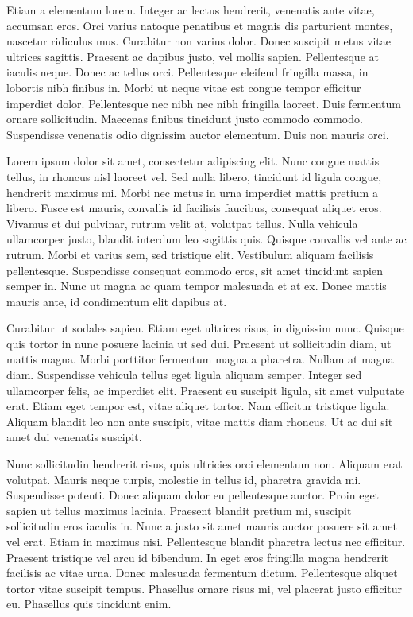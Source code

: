 \documentclass[a4paper,12pt,twoside]{ThesisStyle}
\begin{document}
Etiam a elementum lorem. Integer ac lectus hendrerit, venenatis ante vitae, accumsan eros. Orci varius natoque penatibus et magnis dis parturient montes, nascetur ridiculus mus. Curabitur non varius dolor. Donec suscipit metus vitae ultrices sagittis. Praesent ac dapibus justo, vel mollis sapien. Pellentesque at iaculis neque. Donec ac tellus orci. Pellentesque eleifend fringilla massa, in lobortis nibh finibus in. Morbi ut neque vitae est congue tempor efficitur imperdiet dolor. Pellentesque nec nibh nec nibh fringilla laoreet. Duis fermentum ornare sollicitudin. Maecenas finibus tincidunt justo commodo commodo. Suspendisse venenatis odio dignissim auctor elementum. Duis non mauris orci.

Lorem ipsum dolor sit amet, consectetur adipiscing elit. Nunc congue mattis tellus, in rhoncus nisl laoreet vel. Sed nulla libero, tincidunt id ligula congue, hendrerit maximus mi. Morbi nec metus in urna imperdiet mattis pretium a libero. Fusce est mauris, convallis id facilisis faucibus, consequat aliquet eros. Vivamus et dui pulvinar, rutrum velit at, volutpat tellus. Nulla vehicula ullamcorper justo, blandit interdum leo sagittis quis. Quisque convallis vel ante ac rutrum. Morbi et varius sem, sed tristique elit. Vestibulum aliquam facilisis pellentesque. Suspendisse consequat commodo eros, sit amet tincidunt sapien semper in. Nunc ut magna ac quam tempor malesuada et at ex. Donec mattis mauris ante, id condimentum elit dapibus at.

Curabitur ut sodales sapien. Etiam eget ultrices risus, in dignissim nunc. Quisque quis tortor in nunc posuere lacinia ut sed dui. Praesent ut sollicitudin diam, ut mattis magna. Morbi porttitor fermentum magna a pharetra. Nullam at magna diam. Suspendisse vehicula tellus eget ligula aliquam semper. Integer sed ullamcorper felis, ac imperdiet elit. Praesent eu suscipit ligula, sit amet vulputate erat. Etiam eget tempor est, vitae aliquet tortor. Nam efficitur tristique ligula. Aliquam blandit leo non ante suscipit, vitae mattis diam rhoncus. Ut ac dui sit amet dui venenatis suscipit.

Nunc sollicitudin hendrerit risus, quis ultricies orci elementum non. Aliquam erat volutpat. Mauris neque turpis, molestie in tellus id, pharetra gravida mi. Suspendisse potenti. Donec aliquam dolor eu pellentesque auctor. Proin eget sapien ut tellus maximus lacinia. Praesent blandit pretium mi, suscipit sollicitudin eros iaculis in. Nunc a justo sit amet mauris auctor posuere sit amet vel erat. Etiam in maximus nisi. Pellentesque blandit pharetra lectus nec efficitur. Praesent tristique vel arcu id bibendum. In eget eros fringilla magna hendrerit facilisis ac vitae urna. Donec malesuada fermentum dictum. Pellentesque aliquet tortor vitae suscipit tempus. Phasellus ornare risus mi, vel placerat justo efficitur eu. Phasellus quis tincidunt enim.
\end{document}
